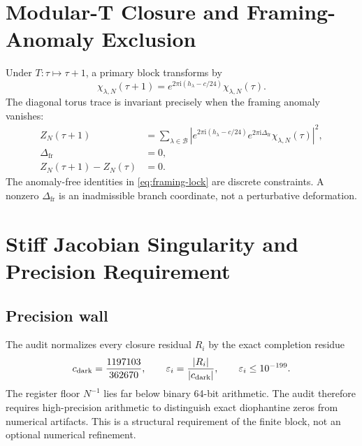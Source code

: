 \documentclass[11pt]{article}
\newcommand{\ii}{\mathrm{i}}
\newcommand{\noiseWall}{10^{-199}}
\begin{document}
\section{Modular-T Closure and Framing-Anomaly Exclusion}

Under \(T:\tau\mapsto\tau+1\), a primary block transforms by
\begin{equation}
  \chi_{\lambda,N}(\tau+1)
  =e^{2\pi\ii(h_\lambda-c/24)}\chi_{\lambda,N}(\tau).
  \label{eq:t-character}
\end{equation}
The diagonal torus trace is invariant precisely when the framing anomaly vanishes:
\begin{equation}
\begin{aligned}
  Z_N(\tau+1)
    &=\sum_{\lambda\in\mathcal{B}}
      \left|e^{2\pi\ii(h_\lambda-c/24)}e^{2\pi\ii\Delta_{\mathrm{fr}}}\chi_{\lambda,N}(\tau)\right|^2,\\
  \Delta_{\mathrm{fr}}&=0,\\
  Z_N(\tau+1)-Z_N(\tau)&=0.
\end{aligned}
\label{eq:t-invariance}
\end{equation}
The anomaly-free identities in \eqref{eq:framing-lock} are discrete constraints.  A nonzero \(\Delta_{\mathrm{fr}}\) is an inadmissible branch coordinate, not a perturbative deformation.

\section{Stiff Jacobian Singularity and Precision Requirement}

\subsection{Precision wall}
The audit normalizes every closure residual \(R_i\) by the exact completion residue
\begin{equation}
  c_{\mathrm{dark}}=\cDarkCompletionExact,
  \qquad
  \varepsilon_i=\frac{|R_i|}{|c_{\mathrm{dark}}|},
  \qquad
  \varepsilon_i\le\noiseWall.
  \label{eq:precision-wall}
\end{equation}
The register floor \(N^{-1}\) lies far below binary 64-bit arithmetic.  The audit therefore requires high-precision arithmetic to distinguish exact diophantine zeros from numerical artifacts.  This is a structural requirement of the finite block, not an optional numerical refinement.
\end{document}
